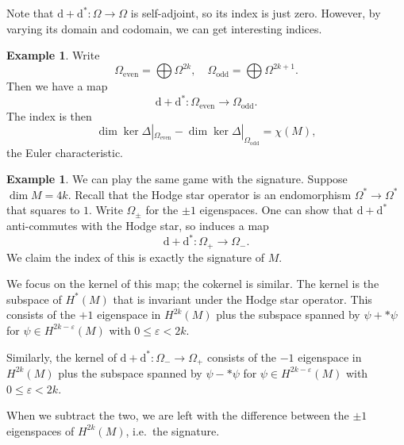 \documentclass{shortart}
\theoremstyle{definition}
\newtheorem{eg}[thm]{Example}
\renewcommand\d{\mathrm{d}}
\begin{document}
Note that $\d + \d^*: \Omega \to \Omega$ is self-adjoint, so its index is just zero. However, by varying its domain and codomain, we can get interesting indices.
\begin{eg}
  Write
  \[
    \Omega_{\mathrm{even}} = \bigoplus \Omega^{2k},\quad \Omega_{\mathrm{odd}} = \bigoplus \Omega^{2k + 1}.
  \]
  Then we have a map
  \[
    \d + \d^*: \Omega_{\mathrm{even}} \to \Omega_{\mathrm{odd}}.
  \]
  The index is then
  \[
    \dim \ker \Delta|_{\Omega_{\mathrm{even}}} - \dim \ker \Delta|_{\Omega_{\mathrm{odd}}} = \chi(M),
  \]
  the Euler characteristic.
\end{eg}

\begin{eg}
  We can play the same game with the signature. Suppose $\dim M = 4k$. Recall that the Hodge star operator is an endomorphism $\Omega^* \to \Omega^*$ that squares to $1$. Write $\Omega_{\pm}$ for the $\pm 1$ eigenspaces. One can show that $\d + \d^*$ anti-commutes with the Hodge star, so induces a map
  \[
    \d + \d^*: \Omega_+ \to \Omega_-.
  \]
  We claim the index of this is exactly the signature of $M$.

  We focus on the kernel of this map; the cokernel is similar. The kernel is the subspace of $H^*(M)$ that is invariant under the Hodge star operator. This consists of the $+1$ eigenspace in $H^{2k}(M)$ plus the subspace spanned by $\psi + *\psi$ for $\psi \in H^{2k - \varepsilon}(M)$ with $0 \leq \varepsilon < 2k$.

  Similarly, the kernel of $\d + \d^*: \Omega_- \to \Omega_+$ consists of the $-1$ eigenspace in $H^{2k}(M)$ plus the subspace spanned by $\psi - *\psi$ for $\psi \in H^{2k - \varepsilon}(M)$ with $0 \leq \varepsilon < 2k$.

  When we subtract the two, we are left with the difference between the $\pm 1$ eigenspaces of $H^{2k}(M)$, i.e.\ the signature.
\end{eg}



\end{document}
